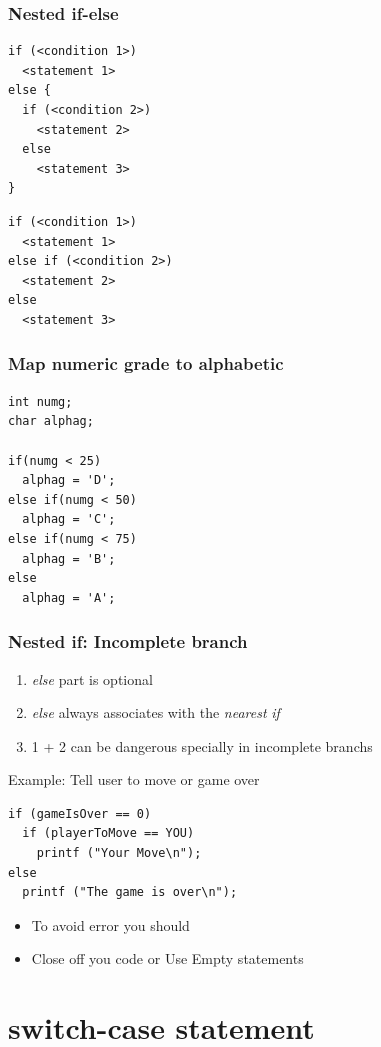 \documentclass{../c-lecture}
\begin{document}
\begin{frame}[fragile]
  \frametitle{Nested if-else}
  \scriptsize
  \begin{verbatim}
if (<condition 1>)
  <statement 1>
else {
  if (<condition 2>)
    <statement 2>
  else
    <statement 3>
}
  \end{verbatim}
  \scriptsize
  \begin{verbatim}
if (<condition 1>)
  <statement 1>
else if (<condition 2>)
  <statement 2>
else
  <statement 3>
  \end{verbatim}
\end{frame}

\begin{frame}[fragile]
  \frametitle{Map numeric grade to alphabetic}
  \begin{verbatim}
int numg;
char alphag;

if(numg < 25)
  alphag = 'D';
else if(numg < 50)
  alphag = 'C';
else if(numg < 75)
  alphag = 'B';
else
  alphag = 'A';
  \end{verbatim}
\end{frame}

\begin{frame}[fragile]
  \frametitle{Nested if: Incomplete branch}
  \begin{enumerate}
    \item \textit{\color{Orange} else} part is optional
    \item
      \textit{\color{Orange} else} always associates with the
      \textit{\color{LimeGreen} nearest}
      \textit{\color{Orange} if}

    \item 1 + 2 can be dangerous specially in incomplete branchs
  \end{enumerate}
  Example: Tell user to move or game over
  \begin{verbatim}
if (gameIsOver == 0)
  if (playerToMove == YOU)
    printf ("Your Move\n");
else
  printf ("The game is over\n");
  \end{verbatim}
  \begin{itemize}
    \item To avoid error you should
    \item Close off you code or Use Empty statements
  \end{itemize}
\end{frame}

\section{switch-case statement}
\end{document}
